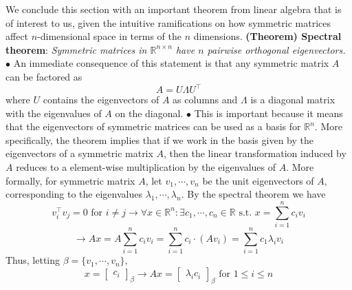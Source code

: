 \documentclass{article}
\begin{document}
\newline
We conclude this section with an important theorem from linear algebra that is of interest to us, given the intuitive ramifications on how symmetric matrices affect $ n $-dimensional space in terms of the $ n $ dimensions.
\newline \newline
\textbf{(Theorem) Spectral theorem}: \textit{Symmetric matrices in $ \mathbb{R}^{n \times n} $ have $ n $ pairwise orthogonal eigenvectors.}
\newline
\indent $ \bullet $ An immediate consequence of this statement is that any symmetric matrix $ A $ can be factored as
$$ A = U \Lambda U^\intercal $$
where $ U $ contains the eigenvectors of $ A $ as columns and $ \Lambda $ is a diagonal matrix with the eigenvalues of $ A $ on the diagonal.
\newline
\indent $ \bullet $ This is important because it means that the eigenvectors of symmetric matrices can be used as a basis for $ \mathbb{R}^n $. More specifically, the theorem implies that if we work in the basis given by the eigenvectors of a symmetric matrix $ A $, then the linear transformation induced by $ A $ reduces to a element-wise multiplication by the eigenvalues of $ A $. More formally, for symmetric matrix $ A $, let $ v_1, \cdots, v_n $ be the unit eigenvectors of $ A $, corresponding to the eigenvalues $ \lambda_1, \cdots, \lambda_n $. By the spectral theorem we have
$$ v_i^\intercal v_j = 0 \text{ for } i \neq j \rightarrow \forall x \in \mathbb{R}^n: \exists c_1, \cdots, c_n \in \mathbb{R} \text{ s.t. } x = \sum_{i = 1}^n c_i v_i $$
$$ \rightarrow A x = A \sum_{i = 1}^n c_i v_i = \sum_{i = 1}^n c_i \cdot (A v_i) = \sum_{i = 1}^n c_1 \lambda_i v_i $$
Thus, letting $ \beta = \{ v_1, \cdots, v_n \} $,
$$ x = \begin{bmatrix} c_i \end{bmatrix}_\beta \rightarrow A x = \begin{bmatrix} \lambda_i c_i \end{bmatrix}_\beta \text{ for } 1 \leq i \leq n $$
\end{document}
